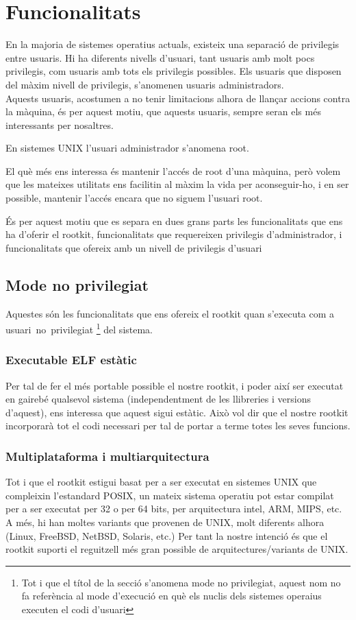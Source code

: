 \chapter{Funcionalitats}

En la majoria de sistemes operatius actuals, existeix una separació de privilegis entre usuaris. Hi
ha diferents nivells d'usuari, tant usuaris amb molt pocs privilegis, com usuaris amb tots els privilegis
possibles. Els usuaris que disposen del màxim nivell de privilegis, s'anomenen usuaris administradors. \\
Aquests usuaris, acostumen a no tenir limitacions alhora de llançar accions contra la màquina, és per aquest
motiu, que aquests usuaris, sempre seran els més interessants per nosaltres.

En sistemes UNIX l'usuari administrador s'anomena root.

El què més ens interessa és mantenir l'accés de root d'una màquina, però volem que les mateixes utilitats
ens facilitin al màxim la vida per aconseguir-ho, i en ser possible, mantenir l'accés encara que no siguem
l'usuari root.


És per aquest motiu que es separa en dues grans parts les funcionalitats que ens ha d'oferir el rootkit,
funcionalitats que requereixen privilegis d'administrador, i funcionalitats que ofereix amb un nivell de privilegis d'usuari

\section{Mode no privilegiat}

Aquestes són les funcionalitats que ens ofereix el rootkit quan s'executa com a \mbox{usuari no privilegiat}
\footnote{Tot i que el títol de la secció s'anomena mode no privilegiat, aquest nom no fa referència al mode d'execució
en què els nuclis dels sistemes operaius executen el codi d'usuari} del sistema.

\subsection{Executable ELF estàtic}
Per tal de fer el més portable possible el nostre rootkit, i poder així ser executat en gairebé qualsevol sistema
(independentment de les llibreries i versions d'aquest), ens interessa que aquest sigui estàtic. Això vol dir que el nostre 
rootkit incorporarà tot el codi necessari per tal de portar a terme totes les seves funcions.

\subsection{Multiplataforma i multiarquitectura}
Tot i que el rootkit estigui basat per a ser executat en sistemes UNIX que compleixin l'estandard POSIX, un mateix sistema 
operatiu pot estar compilat per a ser executat per 32 o per 64 bits, per arquitectura intel, ARM, MIPS, etc. A més, hi han
moltes variants que provenen de UNIX, molt diferents alhora (Linux, FreeBSD, NetBSD, Solaris, etc.) Per tant la nostre
intenció és que el rootkit suporti el reguitzell més gran possible de arquitectures/variants de UNIX.

